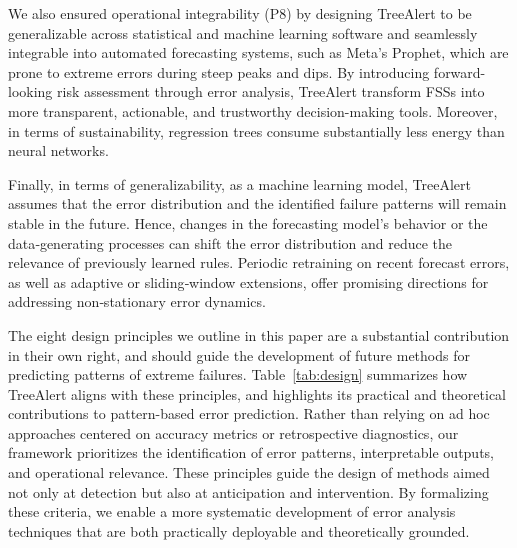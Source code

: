 \documentclass[12pt]{article}
\newcommand{\galit}[1]{\textcolor{red}{#1}}
\begin{document}
We also ensured operational integrability (P8) by designing TreeAlert to be generalizable across statistical and machine learning software and seamlessly integrable into automated forecasting systems, such as Meta's Prophet, which are prone to extreme errors during steep peaks and dips. By introducing forward-looking risk assessment through error analysis, TreeAlert transform FSSs into more transparent, actionable, and trustworthy decision-making tools. Moreover, in terms of sustainability, regression trees consume substantially less energy than neural networks.

Finally, in terms of generalizability, as a machine learning model, TreeAlert assumes that the error distribution and the identified failure patterns will remain stable in the future. Hence, changes in the forecasting model's behavior or the data‑generating processes can shift the error distribution and reduce the relevance of previously learned rules. Periodic retraining on recent forecast errors, as well as adaptive or sliding‑window extensions, offer promising directions for addressing non‑stationary error dynamics.

The eight design principles we outline in this paper are a substantial contribution in their own right, and should guide the development of future methods for predicting patterns of extreme failures. Table~\ref{tab:design} summarizes how TreeAlert aligns with these principles, and highlights its practical and theoretical contributions to pattern-based error prediction. Rather than relying on ad hoc approaches centered on accuracy metrics or retrospective diagnostics, our framework prioritizes the identification of error patterns, interpretable outputs, and operational relevance. These principles guide the design of methods aimed not only at detection but also at anticipation and intervention. By formalizing these criteria, we enable a more systematic development of error analysis techniques that are both practically deployable and theoretically grounded.

\end{document}
